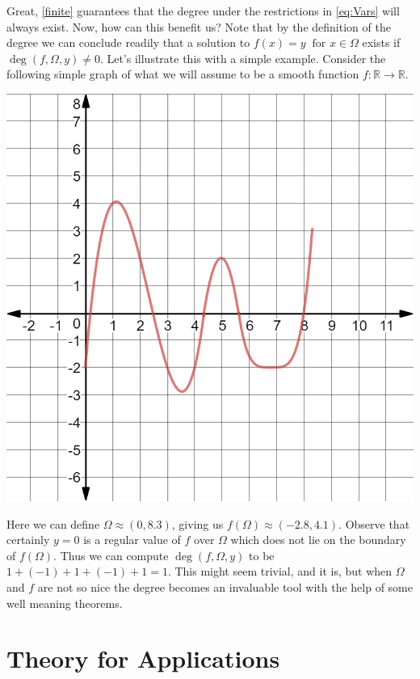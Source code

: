 \documentclass[11pt]{article}
\theoremstyle{plain}
\theoremstyle{definition}
\theoremstyle{remark}
\begin{document}
Great, \cref{finite} guarantees that the degree under the restrictions in \eqref{eq:Vars} will always exist. Now, how can this benefit us?
Note that by the definition of the degree we can conclude readily that a solution to $f(x)=y \ \text{ for } x\in\Omega$ exists if $\operatorname{deg}\left(f,\Omega,y\right)\neq 0$. Let's illustrate this with a simple example. Consider the following simple graph of what we will assume to be a smooth function $f:\mathbb{R}\rightarrow\mathbb{R}$. 
\begin{center}
\includegraphics[scale=0.25]{Figures/Curve1}
\end{center}

Here we can define $\Omega\approx (0,8.3)$, giving us $f(\Omega)\approx (-2.8,4.1)$. Observe that certainly $y=0$ is a regular value of $f$ over $\Omega$ which does not lie on the boundary of $f(\Omega)$. Thus we can compute $\operatorname{deg}\left(f,\Omega,y\right)$ to be $1+(-1)+1+(-1)+1=1$. This might seem trivial, and it is, but when $\Omega$ and $f$ are not so nice the degree becomes an invaluable tool with the help of some well meaning theorems. 

\newpage

\section{Theory for Applications}
\end{document}
